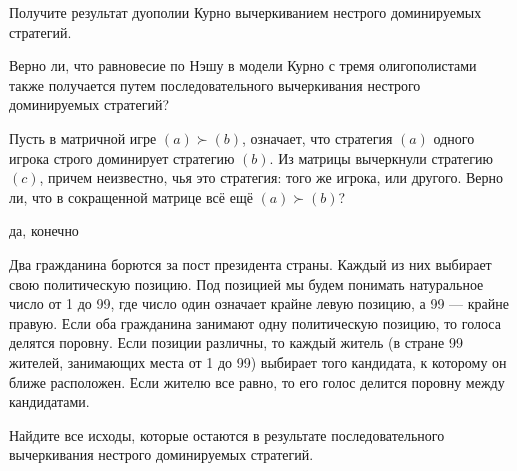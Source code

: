 \begin{problem}
Получите результат дуополии Курно вычеркиванием нестрого доминируемых стратегий.\par
Верно ли, что равновесие по Нэшу в модели Курно с тремя олигополистами также получается путем последовательного вычеркивания нестрого доминируемых стратегий?

\begin{sol}

\end{sol}
\end{problem}



\begin{problem}
Пусть в матричной игре  $\left(a\right)\succ \left(b\right)$, означает, что стратегия  $\left(a\right)$  одного игрока строго доминирует стратегию  $\left(b\right)$. Из матрицы вычеркнули стратегию  $\left(c\right)$, причем неизвестно, чья это стратегия: того же игрока, или другого. Верно ли, что в сокращенной матрице всё ещё   $\left(a\right)\succ \left(b\right)$?




\begin{sol}
да, конечно
\end{sol}
\end{problem}




\begin{problem}[Президент]
Два гражданина борются за пост президента страны. Каждый из них выбирает свою политическую позицию. Под позицией мы будем понимать натуральное число от 1 до 99, где число один означает крайне левую позицию, а 99 — крайне правую. Если оба гражданина занимают одну политическую позицию, то голоса делятся поровну. Если позиции различны, то каждый житель (в стране 99 жителей, занимающих места от 1 до 99) выбирает того кандидата, к которому он ближе расположен. Если жителю все равно, то его голос делится поровну между кандидатами.\par
Найдите все исходы, которые остаются в результате последовательного вычеркивания нестрого доминируемых стратегий.



\begin{sol}

\end{sol}
\end{problem}

